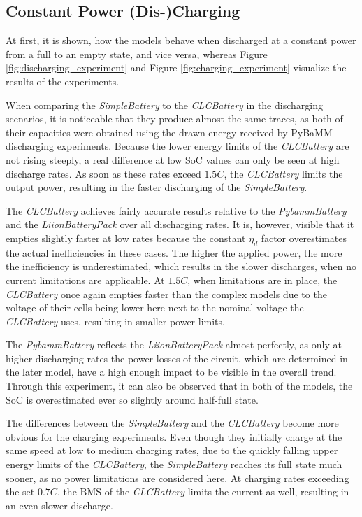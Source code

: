 \subsection{Constant Power (Dis-)Charging}
\label{constant_power_(dis-)charging}
At first, it is shown, how the models behave when discharged at a constant power from a full to an empty state, and vice versa, whereas Figure \ref{fig:discharging_experiment} and Figure \ref{fig:charging_experiment} visualize the results of the experiments. 

When comparing the \textit{SimpleBattery} to the \textit{CLCBattery} in the discharging scenarios, it is noticeable that they produce almost the same traces, as both of their capacities were obtained using the drawn energy received by PyBaMM discharging experiments. Because the lower energy limits of the \textit{CLCBattery} are not rising steeply, a real difference at low SoC values can only be seen at high discharge rates. As soon as these rates exceed $1.5C$, the \textit{CLCBattery} limits the output power, resulting in the faster discharging of the \textit{SimpleBattery}.

The \textit{CLCBattery} achieves fairly accurate results relative to the \textit{PybammBattery} and the \textit{LiionBatteryPack} over all discharging rates. It is, however, visible that it empties slightly faster at low rates because the constant $\eta_d$ factor overestimates the actual inefficiencies in these cases. The higher the applied power, the more the inefficiency is underestimated, which results in the slower discharges, when no current limitations are applicable. At $1.5C$, when limitations are in place, the \textit{CLCBattery} once again empties faster than the complex models due to the voltage of their cells being lower here next to the nominal voltage the \textit{CLCBattery} uses, resulting in smaller power limits. 

The \textit{PybammBattery} reflects the \textit{LiionBatteryPack} almost perfectly, as only at higher discharging rates the power losses of the circuit, which are determined in the later model, have a high enough impact to be visible in the overall trend. Through this experiment, it can also be observed that in both of the models, the SoC is overestimated ever so slightly around half-full state.

The differences between the \textit{SimpleBattery} and the \textit{CLCBattery} become more obvious for the charging experiments. Even though they initially charge at the same speed at low to medium charging rates, due to the quickly falling upper energy limits of the \textit{CLCBattery}, the \textit{SimpleBattery} reaches its full state much sooner, as no power limitations are considered here. At charging rates exceeding the set $0.7C$, the BMS of the \textit{CLCBattery} limits the current as well, resulting in an even slower discharge.

